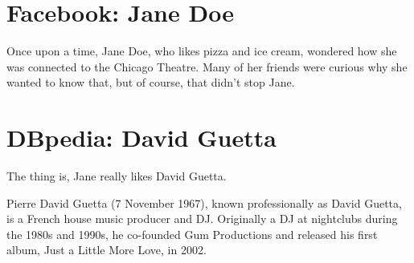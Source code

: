 \documentclass{article}
\begin{document}
\section{Facebook: Jane Doe}
Once upon a time,
Jane Doe,
who likes pizza and ice cream,
wondered how she was connected to the Chicago Theatre.
Many of her friends were curious
why she wanted to know that,
but of course, that didn't stop
Jane.

\section{DBpedia: David Guetta}
The thing is,
Jane really likes David Guetta.

Pierre David Guetta (7 November 1967), known professionally as David Guetta, is a French house music producer and DJ. Originally a DJ at nightclubs during the 1980s and 1990s, he co-founded Gum Productions and released his first album, Just a Little More Love, in 2002.
\end{document}
